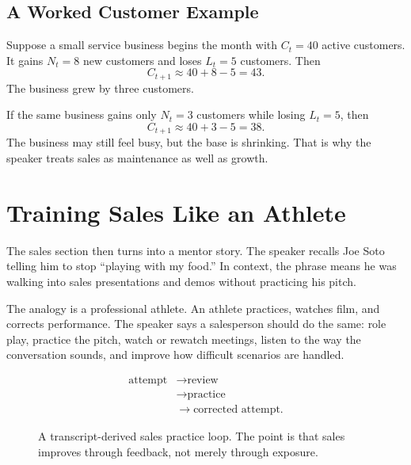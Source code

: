 \subsection{A Worked Customer Example}

Suppose a small service business begins the month with \(C_t=40\) active customers. It gains \(N_t=8\) new customers and loses \(L_t=5\) customers. Then
\[
C_{t+1}\approx 40+8-5=43.
\]
The business grew by three customers.

If the same business gains only \(N_t=3\) customers while losing \(L_t=5\), then
\[
C_{t+1}\approx 40+3-5=38.
\]
The business may still feel busy, but the base is shrinking. That is why the speaker treats sales as maintenance as well as growth.

\section{Training Sales Like an Athlete}

The sales section then turns into a mentor story. The speaker recalls Joe Soto telling him to stop ``playing with my food.'' In context, the phrase means he was walking into sales presentations and demos without practicing his pitch.

The analogy is a professional athlete. An athlete practices, watches film, and corrects performance. The speaker says a salesperson should do the same: role play, practice the pitch, watch or rewatch meetings, listen to the way the conversation sounds, and improve how difficult scenarios are handled.

\[
\begin{aligned}
\text{attempt}
&\longrightarrow \text{review} \\
&\longrightarrow \text{practice} \\
&\longrightarrow \text{corrected attempt}.
\end{aligned}
\]

\begin{figure}
\centering
{}
\caption{A transcript-derived sales practice loop. The point is that sales improves through feedback, not merely through exposure.}
\end{figure}

